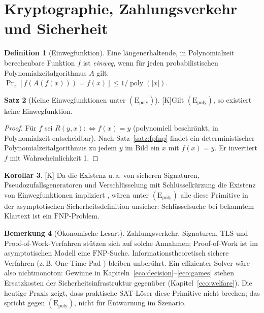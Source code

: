 \documentclass[a4paper,12pt]{article}
\theoremstyle{definition}
\newtheorem{definition}{Definition}[section]
\newtheorem{satz}[definition]{Satz}
\newtheorem{korollar}[definition]{Korollar}
\newtheorem{bemerkung}[definition]{Bemerkung}
\newcommand{\tK}{\textsf{\small[K]}}   %
\newcommand{\cFNP}{\ensuremath{\mathrm{FNP}}}
\newcommand{\Epoly}{(\mathrm{E}_{\mathrm{poly}})}
\newcommand{\poly}{\operatorname{poly}}
\begin{document}
\section{Kryptographie, Zahlungsverkehr und Sicherheit}
\label{eco:crypto}

\begin{definition}[Einwegfunktion]
Eine längenerhaltende, in Polynomialzeit berechenbare Funktion \(f\) ist \emph{einweg}, wenn für jeden probabilistischen Polynomialzeitalgorithmus \(A\) gilt: \(\Pr_x[f(A(f(x)))=f(x)]\le1/\poly(|x|)\).
\end{definition}

\begin{satz}[Keine Einwegfunktionen unter \(\Epoly\)]\tK\label{satz:owf}
Gilt \(\Epoly\), so existiert keine Einwegfunktion.
\end{satz}
\begin{proof}
Für \(f\) sei \(R(y,x):\iff f(x)=y\) (polynomiell beschränkt, in Polynomialzeit entscheidbar). Nach Satz~\ref{satz:fpfnp} findet ein deterministischer Polynomialzeitalgorithmus zu jedem \(y\) im Bild ein \(x\) mit \(f(x)=y\). Er invertiert \(f\) mit Wahrscheinlichkeit 1.
\end{proof}
\begin{korollar}\tK
Da die Existenz u.\,a. von sicheren Signaturen, Pseudozufallsgeneratoren und Verschlüsselung mit Schlüsselkürzung die Existenz von Einwegfunktionen impliziert \cite{impagliazzoluby1989,goldreich2001,impagliazzo1995}, wären unter \(\Epoly\) alle diese Primitive in der asymptotischen Sicherheitsdefinition unsicher: Schlüsselsuche bei bekanntem Klartext ist ein \cFNP-Problem.
\end{korollar}
\begin{bemerkung}[Ökonomische Lesart]
Zahlungsverkehr, Signaturen, TLS und Proof-of-Work-Verfahren stützen sich auf solche Annahmen; Proof-of-Work ist im asymptotischen Modell eine \cFNP-Suche. Informationstheoretisch sichere Verfahren (z.\,B. One-Time-Pad \cite{shannon1949}) bleiben unberührt. Ein effizienter Solver wäre also nichtmonoton: Gewinne in Kapiteln~\ref{eco:decision}--\ref{eco:games} stehen Ersatzkosten der Sicherheitsinfrastruktur gegenüber (Kapitel~\ref{eco:welfare}). Die heutige Praxis zeigt, dass praktische SAT-Löser diese Primitive nicht brechen; das spricht gegen \(\Epoly\), nicht für Entwarnung im Szenario.
\end{bemerkung}

\end{document}
